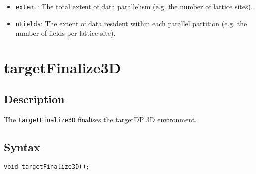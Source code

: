 \begin{itemize}
\item \verb+extent+: The total extent of data parallelism (e.g. the number of lattice sites).
\item \verb+nFields+: The extent of data resident within each parallel partition (e.g. the number of fields per lattice site).
\end{itemize}


\newpage
\section{targetFinalize3D}

\subsection{Description}

The \verb+targetFinalize3D+ finalises the targetDP 3D environment.

\subsection{Syntax}
\begin{verbatim}
void targetFinalize3D();
\end{verbatim}






